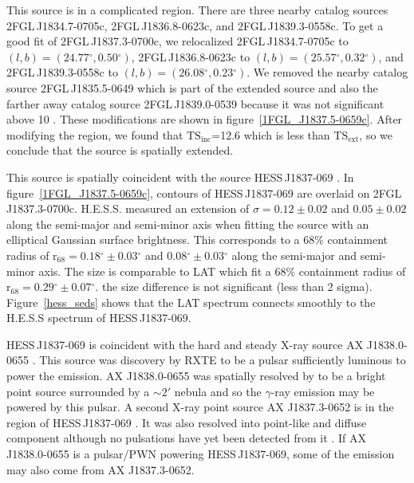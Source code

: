 \documentclass[12pt,preprint]{aastex}
\newcommand{\gev}{\text{GeV}\xspace}
\newcommand{\tev}{\text{TeV}\xspace}
\newcommand{\tsext}{{\ensuremath{\text{TS}_{\text{ext}}}}\xspace}
\newcommand{\tsinc}{\ensuremath{\text{TS}_{\text{inc}}}\xspace}
\newcommand{\chandra}{\text{{\em Chandra}}\xspace}
\newcommand{\rsixeight}{{\ensuremath{\text{r}_{68}}}\xspace}
\renewcommand{\deg}{\ensuremath{^\circ}\xspace}
\begin{document}
This source is in a complicated region. There are three nearby
catalog sources 2FGL\,J1834.7-0705c, 2FGL\,J1836.8-0623c, and
2FGL\,J1839.3-0558c.  To get a good fit of 2FGL\,J1837.3-0700c, we
relocalized 2FGL\,J1834.7-0705c to $(l,b)=(24.77\deg,0.50\deg)$,
2FGL\,J1836.8-0623c to $(l,b)=(25.57\deg,0.32\deg)$, and
2FGL\,J1839.3-0558c to $(l,b)=(26.08\deg,0.23\deg)$.  We removed the
nearby catalog source 2FGL\,J1835.5-0649 which is part of the extended
source and also the farther away catalog source 2FGL\,J1839.0-0539
because it was not significant above 10 \gev. These modifications are
shown in figure~\ref{1FGL_J1837.5-0659c}.  After modifying the region,
we found that \tsinc=12.6 which is less than \tsext, so we conclude that
the source is spatially extended.

This source is spatially coincident with the \tev source HESS\,J1837-069
\citep{hess_plane_survey}.  In figure~\ref{1FGL_J1837.5-0659c}, contours
of HESS\,J1837-069 are overlaid on 2FGL\,J1837.3-0700c. H.E.S.S. measured
an extension of $\sigma=0.12\pm0.02$ and $0.05\pm0.02$
along the semi-major and semi-minor axis when fitting the source
with an elliptical Gaussian surface brightness.  This corresponds
to a 68\% containment radius of $\rsixeight=0.18\deg\pm0.03\deg$ and
$0.08\deg\pm0.03\deg$ along the semi-major and semi-minor axis. The
size is comparable to LAT which fit a 68\% containment radius of
$\rsixeight=0.29\deg\pm0.07\deg$.  the size difference is not significant
(less than 2 sigma).  Figure~\ref{hess_seds} shows that the LAT spectrum
connects smoothly to the H.E.S.S spectrum of HESS\,J1837-069.

\begin{shaded}
HESS\,J1837-069 is coincident
with the hard and steady X-ray source AX J1838.0-0655
\citep{einstein_galactic_plane_survey,hard_x-ray_asca,integral_AX_J1838.0-0655,swift_follow_up,pulsations_HESS_J1837-069,suzaku_HESS_J1837-069}.
This source was discovery by RXTE to be a pulsar sufficiently
luminous to power the \tev emission.  AX J1838.0-0655 was spatially
resolved by \chandra to be a bright point source surrounded by
a $\sim2'$ nebula \citep{pulsations_HESS_J1837-069} and so the
$\gamma$-ray emission may be powered by this pulsar.  A second
X-ray point source AX J1837.3-0652 is in the region of HESS\,J1837-069
\citep{hard_x-ray_asca,swift_follow_up,pulsations_HESS_J1837-069,suzaku_HESS_J1837-069}.
It was also resolved into point-like and diffuse component
although no pulsations have yet been detected from it
\citep{pulsations_HESS_J1837-069}.  If AX J1838.0-0655 is a pulsar/PWN
powering HESS\,J1837-069, some of the \tev emission may also come from
AX J1837.3-0652.
\end{shaded}
\end{document}
